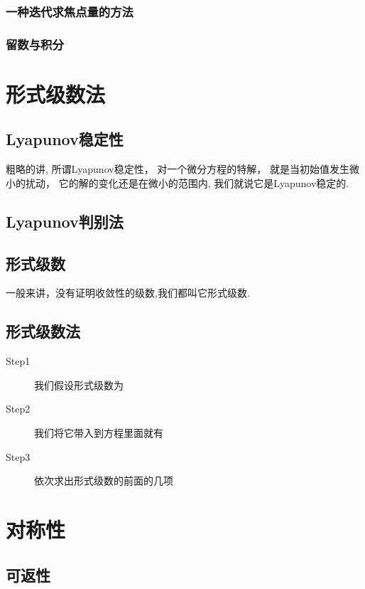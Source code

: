 \subsubsection{一种迭代求焦点量的方法}

\subsubsection{留数与积分}
\begin{defination} [留数]

\end{defination}
\section{形式级数法}
\subsection{Lyapunov稳定性}
粗略的讲,
所谓Lyapunov稳定性，
对一个微分方程的特解，
就是当初始值发生微小的扰动，
它的解的变化还是在微小的范围内,
我们就说它是Lyapunov稳定的.
\subsection{Lyapunov判别法}

\subsection{形式级数}
一般来讲，没有证明收敛性的级数,我们都叫它形式级数.
\subsection{形式级数法}

\begin{description}
\item[Step1] 我们假设形式级数为

\item[Step2] 我们将它带入到方程里面就有

\item[Step3] 依次求出形式级数的前面的几项

\end{description}
\section{对称性}
\subsection{可返性}

